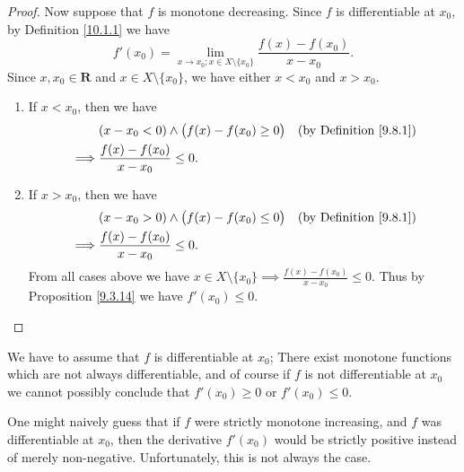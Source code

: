 \begin{proof}
    Now suppose that \(f\) is monotone decreasing.
    Since \(f\) is differentiable at \(x_0\), by Definition \ref{10.1.1} we have
    \[
        f'(x_0) = \lim_{x \to x_0 ; x \in X \setminus \{x_0\}} \frac{f(x) - f(x_0)}{x - x_0}.
    \]
    Since \(x, x_0 \in \mathbf{R}\) and \(x \in X \setminus \{x_0\}\), we have either \(x < x_0\) and \(x > x_0\).
    \begin{enumerate}
        \item If \(x < x_0\), then we have
              \begin{align*}
                           & (x - x_0 < 0) \land \big(f(x) - f(x_0) \geq 0\big) & \text{(by Definition \ref{9.8.1})} \\
                  \implies & \frac{f(x) - f(x_0)}{x - x_0} \leq 0.                                                   \\
              \end{align*}
        \item If \(x > x_0\), then we have
              \begin{align*}
                           & (x - x_0 > 0) \land \big(f(x) - f(x_0) \leq 0\big) & \text{(by Definition \ref{9.8.1})} \\
                  \implies & \frac{f(x) - f(x_0)}{x - x_0} \leq 0.                                                   \\
              \end{align*}
              From all cases above we have \(x \in X \setminus \{x_0\} \implies \frac{f(x) - f(x_0)}{x - x_0} \leq 0\).
              Thus by Proposition \ref{9.3.14} we have \(f'(x_0) \leq 0\).
    \end{enumerate}
\end{proof}

\begin{remark}\label{10.3.2}
    We have to assume that \(f\) is differentiable at \(x_0\);
    There exist monotone functions which are not always differentiable, and of course if \(f\) is not differentiable at \(x_0\) we cannot possibly conclude that \(f'(x_0) \geq 0\) or \(f'(x_0) \leq 0\).
\end{remark}

\begin{note}
    One might naively guess that if \(f\) were strictly monotone increasing, and \(f\) was differentiable at \(x_0\), then the derivative \(f'(x_0)\) would be strictly positive instead of merely non-negative.
    Unfortunately, this is not always the case.
\end{note}

